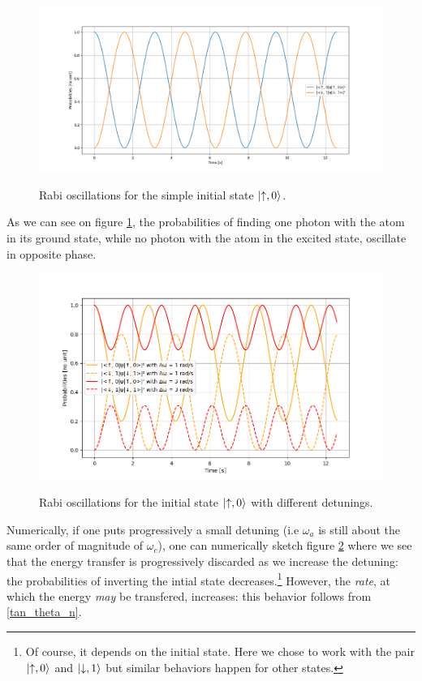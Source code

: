 \documentclass[10pt]{report}
\DeclarePairedDelimiter\ket{\lvert}{\rangle}
\begin{document}
\begin{figure}[h]
\caption{Rabi oscillations for the simple initial state $\ket{\uparrow, 0}$.}
\centering
\includegraphics[width=\textwidth]{rabi-no-delta}
\label{fig:rabi-no-delta}
\end{figure}

As we can see on figure \ref{fig:rabi-no-delta}, the probabilities of finding one photon with the atom in its ground state, while no photon with the atom in the excited state, oscillate in opposite phase.

\begin{figure}[h!]
\caption{Rabi oscillations for the initial state $\ket{\uparrow, 0}$ with different detunings.}
\centering
\includegraphics[width=\textwidth]{rabi-prog-delta}
\label{fig:rabi-prog-delta}
\end{figure}

Numerically, if one puts progressively a small detuning (i.e $\omega_a$ is still about the same order of magnitude of $\omega_c$), one can numerically sketch figure \ref{fig:rabi-prog-delta} where we see that the energy transfer is progressively discarded as we increase the detuning: the probabilities of inverting the intial state decreases.\footnote{Of course, it depends on the initial state. Here we chose to work with the pair $\ket{\uparrow, 0}$ and $\ket{\downarrow, 1}$ but similar behaviors happen for other states.} However, the \textit{rate}, at which the energy \textit{may} be transfered, increases: this behavior follows from \eqref{tan_theta_n}.
\end{document}
